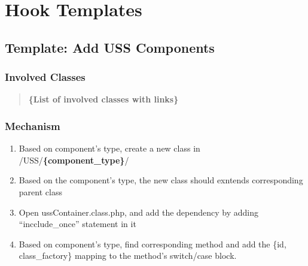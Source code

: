 \documentclass[letterpaper,10pt,english]{sphinxmanual}
\begin{document}
\chapter{Hook Templates}
\label{index:hook-templates}

\section{Template: Add USS Components}
\label{docs/hooks/t_uss_components:template-add-uss-components}\label{docs/hooks/t_uss_components::doc}\label{docs/hooks/t_uss_components:hook-template-uss}

\subsection{Involved Classes}
\label{docs/hooks/t_uss_components:involved-classes}\begin{quote}

\textbf{\{List of involved classes with links\}}
\end{quote}


\subsection{Mechanism}
\label{docs/hooks/t_uss_components:mechanism}\begin{enumerate}
\item {} 
Based on component's type, create a new class in /USS/\textbf{\{component\_type\}}/

\item {} 
Based on the component's type, the new class should exntends corresponding parent class

\item {} 
Open ussContainer.class.php, and add the dependency by adding ``incclude\_once'' statement in it

\item {} 
Based on component's type, find corresponding method and add the \{id, class\_factory\} mapping to the method's switch/case block.

\end{enumerate}
\end{document}
